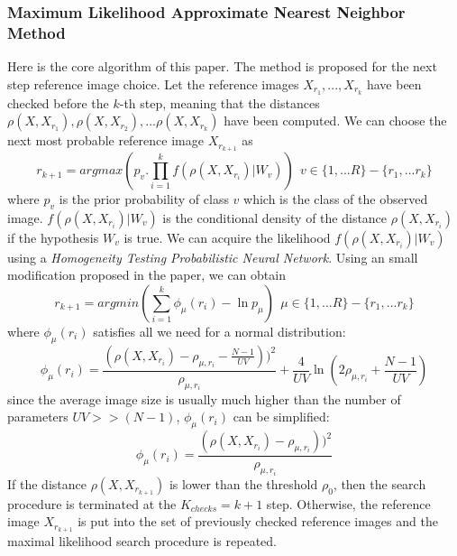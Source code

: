 \subsubsection{Maximum Likelihood Approximate Nearest Neighbor Method}
Here is the core algorithm of this paper. The method is proposed for the next step reference image choice. Let the reference images $X_{r_1}, ..., X_{r_k}$ have been checked before the $k$-th step, meaning that the distances\\ $\rho(X, X_{r_1}), \rho(X, X_{r_2}), ...\rho(X, X_{r_k})$ have been computed. We can choose the next most probable reference image $X_{r_{k+1}}$ as
\begin{equation}
	r_{k + 1} = argmax (p_v . \prod_{i = 1}^{k}f(\rho(X, X_{r_i}) | W_v)) \ \ v\in\{1, ... R\} - \{r_1, ... r_k\}
\end{equation}
where $p_v$ is the prior probability of class $v$ which is the class of the observed image. $f(\rho(X, X_{r_i}) | W_v)$ is the conditional density of the distance $\rho(X, X_{r_i})$ if the hypothesis $W_v$ is true. We can acquire the likelihood $f(\rho(X, X_{r_i}) | W_v)$ using a \textit{Homogeneity Testing Probabilistic Neural Network}. Using an small modification proposed in the paper, we can obtain
\begin{equation}
	r_{k + 1} = argmin(\sum_{i = 1}^{k}\phi_\mu(r_i) - \ln p_\mu) \ \ \mu \in \{1, ... R\} - \{r_1, ... r_k\}
\end{equation}
where $\phi_\mu(r_i)$ satisfies all we need for a normal distribution:
\begin{equation}
	\phi_\mu(r_i) = \frac{(\rho(X, X_{r_i}) - \rho_{\mu, r_i} - \frac{N - 1}{UV}))^2}{\rho_{\mu, r_i}} + \frac{4}{UV}\ln (2\rho_{\mu, r_i} + \frac{N - 1}{UV})
\end{equation}
since the average image size is usually much higher than the number of parameters $UV >> (N - 1)$, $\phi_\mu(r_i)$ can be simplified:
\begin{equation}
	\phi_\mu(r_i) = \frac{(\rho(X, X_{r_i}) - \rho_{\mu, r_i}))^2}{\rho_{\mu, r_i}}
\end{equation}
If the distance $\rho(X, X_{r_{k + 1}})$ is lower than the threshold $\rho_0$, then the search procedure is terminated at the $K_{checks} = k + 1$ step. Otherwise, the reference image $X_{r_{k + 1}}$ is put into the set of previously checked reference images and the maximal likelihood search procedure is repeated.

